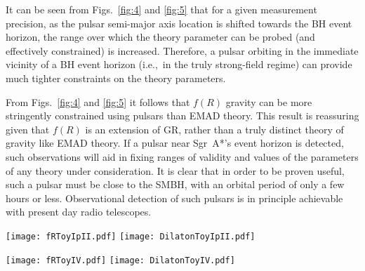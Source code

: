 \documentclass[a4paper,aps,twocolumn,showpacs,showkeys,nofootinbib,preprintnumbers,superscriptaddress,amsmath,amssymb,amsfonts]{revtex4-1}
\newcommand{\ie}{{i.e.,}~}
\begin{document}
It can be seen from Figs.~\ref{fig:4} and \ref{fig:5} that for a given measurement 
precision, as the pulsar semi-major axis location is shifted towards the BH
event horizon, the range over which the theory parameter can be probed 
(and effectively constrained) is increased.
Therefore, a pulsar orbiting in the immediate vicinity of a BH event horizon
(\ie in the truly strong-field regime) can provide much tighter constraints
on the theory parameters.

From Figs.~\ref{fig:4} and \ref{fig:5} it follows that $f(R)$ gravity
can be more stringently constrained using pulsars than EMAD theory.
This result is reassuring given that $f(R)$ is an extension
of GR, rather than a truly distinct theory of gravity like EMAD theory.
If a pulsar near Sgr~A*'s event horizon is detected, such observations will
aid in fixing ranges of validity and values of the parameters
of any theory under consideration. 
It is clear that in order to be proven useful, such a pulsar must be
close to the SMBH, with an orbital period of only a few hours or less.
Observational detection of such pulsars is in principle
achievable with present day radio telescopes.

\begin{figure*}
\texttt{[image: fRToyIpII.pdf]} 
 \texttt{[image: DilatonToyIpII.pdf]} 
\caption{Relative difference of the zeroth order periastron advance with respect to
the GR value plotted as a function of semi-major axis distance for
Toy models I \& II in the case of $f(R)$ (left panel) and EMAD (right panel).
Different coloured lines indicate, for a fixed value of the theory parameter
($\alpha$ or $\hat{b}$), the variation in this relative difference as a function
of semi-major axis.
The 51 lines are equally spaced (logarithmically) between the stated inset 
upper limits of $\alpha \leq 1.288 \times 10^{-4}$ and $\hat{b} \leq 6.68 \times 10^{-8}$,
and 0.01 times those values, i.e. 25 equally spaced values per decade.
The verical solid lines at $175.4$ AU (blue) and $43.85$ AU (magenta) 
indicate the semi-major axis positions of Toy models I and II, respectively.
}
\label{fig:4}
\end{figure*}


\begin{figure*}
\texttt{[image: fRToyIV.pdf]} 
 \texttt{[image: DilatonToyIV.pdf]}
\caption{Relative difference of the zeroth order periastron advance with respect to
the GR value plotted as a function of semi-major axis distance for
Toy models IV in the case of $f(R)$ (left panel) and EMAD (right panel).
Different coloured lines are as discussed in Fig.~\ref{fig:4},
with upper limits of $\alpha \leq 1.396 \times 10^{-4}$ and
$\hat{b} \leq 7.762 \times 10^{-8}$.
The vertical solid line (blue) at $1$ AU 
denotes the semi-major axis position of Toy model IV.
}
\label{fig:5}
\end{figure*}
\end{document}
